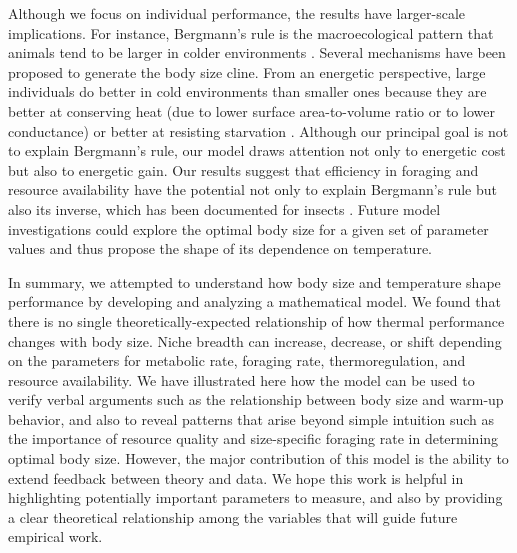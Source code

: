 Although we focus on individual performance, the results have larger-scale implications.
For instance, Bergmann's rule is the macroecological pattern that animals tend to be larger in colder environments \citep{Bergmann1847, Blackburn1999}.
Several mechanisms have been proposed to generate the body size cline.
From an energetic perspective, large individuals do better in cold environments than smaller ones because they are better at conserving heat (due to lower surface area-to-volume ratio or to lower conductance) or better at resisting starvation \citep{James1970, Smith1995, Cushman1993, Blackburn1999}.
Although our principal goal is not to explain Bergmann's rule, our model draws attention not only to energetic cost but also to energetic gain.
Our results suggest that efficiency in foraging and resource availability have the potential not only to explain Bergmann's rule but also its inverse, which has been documented for insects \citep{Cushman1993, Loder1997,Blackburn1999}.
Future model investigations could explore the optimal body size for a given set of parameter values and thus propose the shape of its dependence on temperature.


In summary, we attempted to understand how body size and temperature shape performance by developing and analyzing a mathematical model.
We found that there is no single theoretically-expected relationship of how thermal performance changes with body size.
Niche breadth can increase, decrease, or shift depending on the parameters for metabolic rate, foraging rate, thermoregulation, and resource availability.
We have illustrated here how the model can be used to verify verbal arguments such as the relationship between body size and warm-up behavior, and also to reveal patterns that arise beyond simple intuition such as the importance of resource quality and size-specific foraging rate in determining optimal body size.
However, the major contribution of this model is the ability to extend feedback between theory and data. %
We hope this work is helpful in highlighting potentially important parameters to measure, and also by providing a clear theoretical relationship among the variables that will guide future empirical work.
